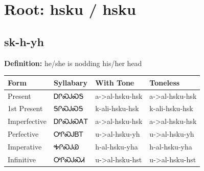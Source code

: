\documentclass{article}%
\begin{document}
%
\normalsize%
\section*{Root: hsku / hsku}%
\subsection*{sk-h-yh}%
\textbf{Definition: }%
he/she is nodding his/her head%
\\[0.5em]%
\begin{tabular}{|l|l|l|l|}%
\hline%
\textbf{Form}&\textbf{Syllabary}&\textbf{With Tone}&\textbf{Toneless}\\%
\hline%
Present&ᎠᎵᏍᎫᏍᎦ&a{-}>al{-}hsku{-}hsk&a{-}>al{-}hsku{-}hsk\\%
1st Present&ᎦᎵᏍᎫᏍᎦ&k{-}ali{-}hsku{-}hsk&k{-}ali{-}hsku{-}hsk\\%
Imperfective&ᎠᎵᏍᎫᏍᎪᎢ&a{-}>al{-}hsku{-}hsk&a{-}>al{-}hsku{-}hsk\\%
Perfective&ᎤᎵᏍᎫᏴᎢ&u{-}>al{-}hsku{-}yh&u{-}>al{-}hsku{-}yh\\%
Imperative&ᎭᎵᏍᎫᏯ&h{-}al{-}hsku{-}yha&h{-}al{-}hsku{-}yha\\%
Infinitive&ᎤᎵᏍᎫᏍᏗ&u{-}>al{-}hsku{-}hst&u{-}>al{-}hsku{-}hst\\%
\hline%
\end{tabular}%
\\[1em]%
\end{document}
